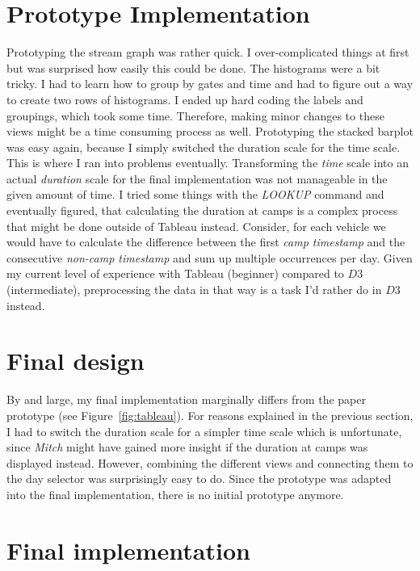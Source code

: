 \documentclass{article}
\begin{document}
\section{Prototype Implementation} \label{sec:protoimpl}
Prototyping the stream graph was rather quick. I over-complicated things at first but was surprised how easily this could be done.
The histograms were a bit tricky. I had to learn how to group by gates and time and had to figure out a way to create two rows of histograms. I ended up hard coding the labels and groupings, which took some time. Therefore, making minor changes to these views might be a time consuming process as well.
Prototyping the stacked barplot was easy again, because I simply switched the duration scale for the time scale. This is where I ran into problems eventually. Transforming the \textit{time} scale into an actual \textit{duration} scale for the final implementation was not manageable in the given amount of time. I tried some things with the \textit{LOOKUP} command and eventually figured, that calculating the duration at camps is a complex process that might be done outside of Tableau instead. Consider, for each vehicle we would have to calculate the difference between the first \textit{camp timestamp} and the consecutive \textit{non-camp timestamp} and sum up multiple occurrences per day. Given my current level of experience with Tableau (beginner) compared to $D3$ (intermediate), preprocessing the data in that way is a task I'd rather do in $D3$ instead.

\section*{Final design}
By and large, my final implementation marginally differs from the paper prototype (see Figure~\ref{fig:tableau}). For reasons explained in the previous section, I had to switch the duration scale for a simpler time scale which is unfortunate, since \textit{Mitch} might have gained more insight if the duration at camps was displayed instead. However, combining the different views and connecting them to the day selector was surprisingly easy to do. Since the prototype was adapted into the final implementation, there is no initial prototype anymore.

\section*{Final implementation}
\end{document}
